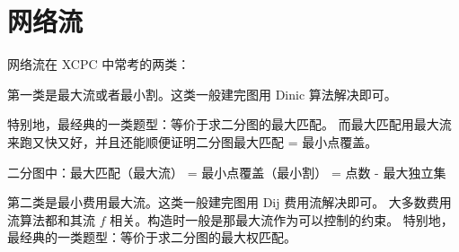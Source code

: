 \section{网络流}

网络流在 XCPC 中常考的两类：

第一类是最大流或者最小割。这类一般建完图用 Dinic 算法解决即可。

特别地，最经典的一类题型：等价于求二分图的最大匹配。
而最大匹配用最大流来跑又快又好，并且还能顺便证明二分图最大匹配 = 最小点覆盖。

二分图中：最大匹配（最大流） = 最小点覆盖（最小割） = 点数 - 最大独立集

第二类是最小费用最大流。这类一般建完图用 Dij 费用流解决即可。
大多数费用流算法都和其流 $f$ 相关。构造时一般是那最大流作为可以控制的约束。
特别地，最经典的一类题型：等价于求二分图的最大权匹配。
